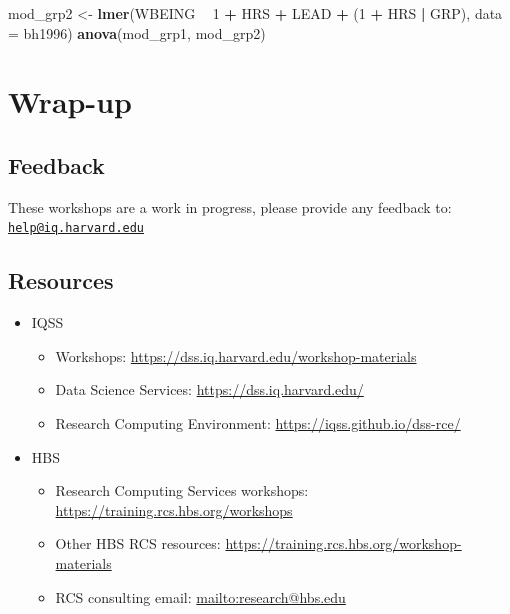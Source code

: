 \documentclass[]{book}
\newenvironment{Shaded}{\begin{snugshade}}{\end{snugshade}}
\newcommand{\DataTypeTok}[1]{\textcolor[rgb]{0.13,0.29,0.53}{#1}}
\newcommand{\DecValTok}[1]{\textcolor[rgb]{0.00,0.00,0.81}{#1}}
\newcommand{\KeywordTok}[1]{\textcolor[rgb]{0.13,0.29,0.53}{\textbf{#1}}}
\newcommand{\NormalTok}[1]{#1}
\newcommand{\OperatorTok}[1]{\textcolor[rgb]{0.81,0.36,0.00}{\textbf{#1}}}
\newcommand{\StringTok}[1]{\textcolor[rgb]{0.31,0.60,0.02}{#1}}
\providecommand{\tightlist}{%
  \setlength{\itemsep}{0pt}\setlength{\parskip}{0pt}}
\begin{document}
\begin{Shaded}
\begin{Highlighting}[]
\NormalTok{  mod_grp2 <-}\StringTok{ }\KeywordTok{lmer}\NormalTok{(WBEING }\OperatorTok{~}\StringTok{ }\DecValTok{1} \OperatorTok{+}\StringTok{ }\NormalTok{HRS }\OperatorTok{+}\StringTok{ }\NormalTok{LEAD }\OperatorTok{+}\StringTok{ }\NormalTok{(}\DecValTok{1} \OperatorTok{+}\StringTok{ }\NormalTok{HRS }\OperatorTok{|}\StringTok{ }\NormalTok{GRP), }\DataTypeTok{data =}\NormalTok{ bh1996)}
  \KeywordTok{anova}\NormalTok{(mod_grp1, mod_grp2)}
\end{Highlighting}
\end{Shaded}

\hypertarget{wrap-up-2}{%
\section{Wrap-up}\label{wrap-up-2}}

\hypertarget{feedback-2}{%
\subsection{Feedback}\label{feedback-2}}

These workshops are a work in progress, please provide any feedback to: \href{mailto:help@iq.harvard.edu}{\nolinkurl{help@iq.harvard.edu}}

\hypertarget{resources-2}{%
\subsection{Resources}\label{resources-2}}

\begin{itemize}
\tightlist
\item
  IQSS

  \begin{itemize}
  \tightlist
  \item
    Workshops: \url{https://dss.iq.harvard.edu/workshop-materials}
  \item
    Data Science Services: \url{https://dss.iq.harvard.edu/}
  \item
    Research Computing Environment: \url{https://iqss.github.io/dss-rce/}
  \end{itemize}
\item
  HBS

  \begin{itemize}
  \tightlist
  \item
    Research Computing Services workshops: \url{https://training.rcs.hbs.org/workshops}
  \item
    Other HBS RCS resources: \url{https://training.rcs.hbs.org/workshop-materials}
  \item
    RCS consulting email: \url{mailto:research@hbs.edu}
  \end{itemize}
\end{itemize}
\end{document}
